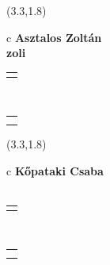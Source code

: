 \documentclass[11pt]{article}
\begin{document}
\makebox(3.3,1.8){
  \renewcommand\arraystretch{1.3}
  \begin{tabular}[c]{c}
    \hspace{8.5mm}
    \LARGE\bf{ Asztalos Zoltán }\\
    \hspace{8.5mm}
    \Large{ zoli }\\
    \renewcommand\arraystretch{3}
    \begin{tabular}[c]{c}
      \centering
      \fontfamily{phv}\selectfont{
        \textbf{
          \textsc{
            \scriptsize{
            \color{Bright}{ Ismerkedő }\color{Dark}{ Webmester }\color{Dark}{ Sminkmester }\color{Bright}{ Programozó }
            }
          }
        }
      }
    \end{tabular}
    \\
    \renewcommand\arraystretch{1}
    \begin{tabular}{p{3.3in}}
      \hspace{.7cm}\\
      \hspace{.7cm}\emph{  }\\
    \end{tabular}
  \end{tabular}
}

\makebox(3.3,1.8){
  \renewcommand\arraystretch{1.3}
  \begin{tabular}[c]{c}
    \hspace{8.5mm}
    \LARGE\bf{ Kőpataki Csaba }\\
    \hspace{8.5mm}
    \Large{  }\\
    \renewcommand\arraystretch{3}
    \begin{tabular}[c]{c}
      \centering
      \fontfamily{phv}\selectfont{
        \textbf{
          \textsc{
            \scriptsize{
            \color{Dark}{ Ismerkedő }\color{Bright}{ Webmester }\color{Bright}{ Sminkmester }\color{Bright}{ Programozó }
            }
          }
        }
      }
    \end{tabular}
    \\
    \renewcommand\arraystretch{1}
    \begin{tabular}{p{3.3in}}
      \hspace{.7cm}\\
      \hspace{.7cm}\emph{  }\\
    \end{tabular}
  \end{tabular}
}
\end{document}
